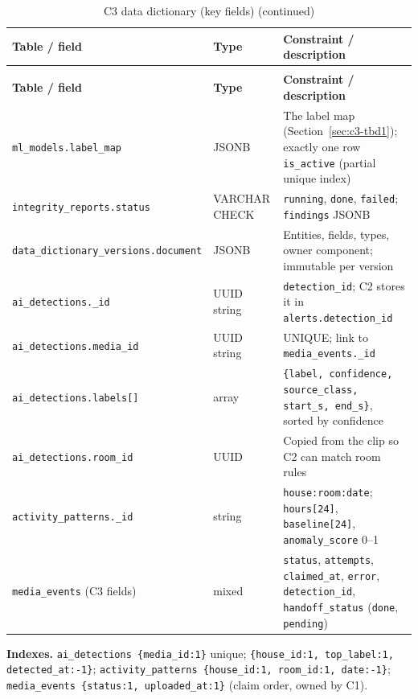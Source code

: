 
\begin{longtable}{L{4.4cm}L{3.0cm}L{7.2cm}}
\caption{C3 data dictionary (key fields)}\label{tab:c3-dd}\\
\toprule
\textbf{Table / field} & \textbf{Type} & \textbf{Constraint / description} \\
\midrule
\endfirsthead
\caption[]{C3 data dictionary (key fields) (continued)}\\
\toprule
\textbf{Table / field} & \textbf{Type} & \textbf{Constraint / description} \\
\midrule
\endhead
\texttt{ml\_models.label\_map} & JSONB & The label map (Section~\ref{sec:c3-tbd1}); exactly one row \texttt{is\_active} (partial unique index) \\
\texttt{integrity\_reports.status} & VARCHAR CHECK & \texttt{running}, \texttt{done}, \texttt{failed}; \texttt{findings} JSONB \\
\texttt{data\_dictionary\_versions.document} & JSONB & Entities, fields, types, owner component; immutable per version \\
\texttt{ai\_detections.\_id} & UUID string & \texttt{detection\_id}; C2 stores it in \texttt{alerts.detection\_id} \\
\texttt{ai\_detections.media\_id} & UUID string & UNIQUE; link to \texttt{media\_events.\_id} \\
\texttt{ai\_detections.labels[]} & array & \texttt{\{label, confidence, source\_class, start\_s, end\_s\}}, sorted by confidence \\
\texttt{ai\_detections.room\_id} & UUID & Copied from the clip so C2 can match room rules \\
\texttt{activity\_patterns.\_id} & string & \texttt{house:room:date}; \texttt{hours[24]}, \texttt{baseline[24]}, \texttt{anomaly\_score} 0--1 \\
\texttt{media\_events} (C3 fields) & mixed & \texttt{status}, \texttt{attempts}, \texttt{claimed\_at}, \texttt{error}, \texttt{detection\_id}, \texttt{handoff\_status} (\texttt{done}, \texttt{pending}) \\
\bottomrule
\end{longtable}
\textbf{Indexes.} \texttt{ai\_detections \{media\_id:1\}} unique; \texttt{\{house\_id:1, top\_label:1, detected\_at:-1\}};
\texttt{activity\_patterns \{house\_id:1, room\_id:1, date:-1\}}; \texttt{media\_events \{status:1, uploaded\_at:1\}} (claim order, owned by C1).

